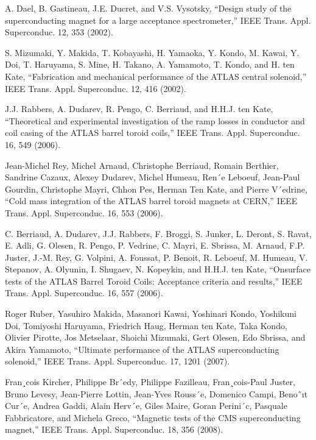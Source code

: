 \noindent [9.293] A. Dael, B. Gastineau, J.E. Ducret, and V.S. Vysotsky, ``Design study of the
superconducting magnet for a large acceptance spectrometer,” IEEE Trans. Appl.
Superconduc. 12, 353 (2002).

\noindent [9.294] S. Mizumaki, Y. Makida, T. Kobayashi, H. Yamaoka, Y. Kondo, M. Kawai,
Y. Doi, T. Haruyama, S. Mine, H. Takano, A. Yamamoto, T. Kondo, and H. ten
Kate, ``Fabrication and mechanical performance of the ATLAS central solenoid,”
IEEE Trans. Appl. Superconduc. 12, 416 (2002).

\noindent [9.295] J.J. Rabbers, A. Dudarev, R. Pengo, C. Berriaud, and H.H.J. ten Kate, ``Theoretical
and experimental investigation of the ramp losses in conductor and coil
casing of the ATLAS barrel toroid coils,” IEEE Trans. Appl. Superconduc. 16,
549 (2006).

\noindent [9.296] Jean-Michel Rey, Michel Arnaud, Christophe Berriaud, Romain Berthier, Sandrine
Cazaux, Alexey Dudarev, Michel Humeau, Ren´e Leboeuf, Jean-Paul Gourdin,
Christophe Mayri, Chhon Pes, Herman Ten Kate, and Pierre V´edrine, ``Cold
mass integration of the ATLAS barrel toroid magnets at CERN,” IEEE Trans.
Appl. Superconduc. 16, 553 (2006).

\noindent [9.297] C. Berriaud, A. Dudarev, J.J. Rabbers, F. Broggi, S. Junker, L. Deront, S. Ravat,
E. Adli, G. Olesen, R. Pengo, P. Vedrine, C. Mayri, E. Sbrissa, M. Arnaud,
F.P. Juster, J.-M. Rey, G. Volpini, A. Foussat, P. Benoit, R. Leboeuf, M. Humeau,
V. Stepanov, A. Olyunin, I. Shugaev, N. Kopeykin, and H.H.J. ten Kate, ``Onsurface
tests of the ATLAS Barrel Toroid Coils: Acceptance criteria and results,”
IEEE Trans. Appl. Superconduc. 16, 557 (2006).

\noindent [9.298] Roger Ruber, Yasuhiro Makida, Masanori Kawai, Yoshinari Kondo, Yoshikuni
Doi, Tomiyoshi Haruyama, Friedrich Haug, Herman ten Kate, Taka Kondo, Olivier
Pirotte, Jos Metselaar, Shoichi Mizumaki, Gert Olesen, Edo Sbrissa, and Akira
Yamamoto, ``Ultimate performance of the ATLAS superconducting solenoid,”
IEEE Trans. Appl. Superconduc. 17, 1201 (2007).

\noindent [9.299] Fran¸cois Kircher, Philippe Br´edy, Philippe Fazilleau, Fran¸cois-Paul Juster, Bruno
Levesy, Jean-Pierre Lottin, Jean-Yves Rouss´e, Domenico Campi, Benoˆıt Cur´e,
Andrea Gaddi, Alain Herv´e, Giles Maire, Goran Perini´c, Pasquale Fabbricatore,
and Michela Greco, ``Magnetic tests of the CMS superconducting magnet,” IEEE
Trans. Appl. Superconduc. 18, 356 (2008).

